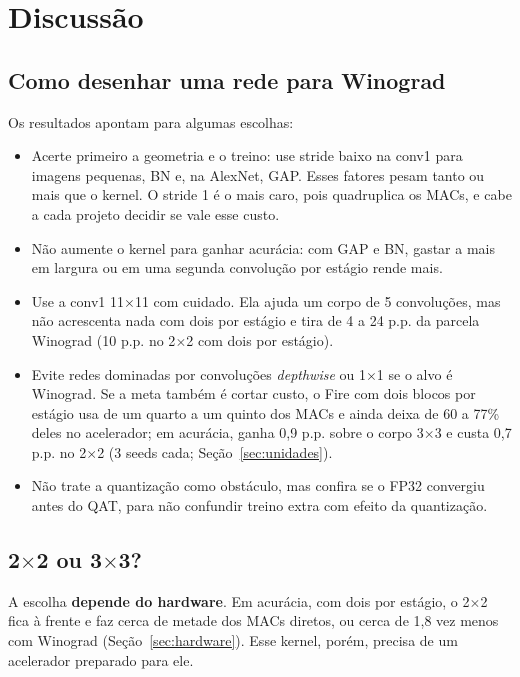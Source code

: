 \documentclass[conference]{IEEEtran}
\newcommand{\by}{\ensuremath{\times}}
\begin{document}
\FloatBarrier

\section{Discussão}

\subsection{Como desenhar uma rede para Winograd}

Os resultados apontam para algumas escolhas:
\begin{itemize}
\item Acerte primeiro a geometria e o treino: use stride baixo na conv1 para imagens pequenas, BN e, na AlexNet, GAP. Esses fatores pesam tanto ou mais que o kernel. O stride 1 é o mais caro, pois quadruplica os MACs, e cabe a cada projeto decidir se vale esse custo.
\item Não aumente o kernel para ganhar acurácia: com GAP e BN, gastar a mais em largura ou em uma segunda convolução por estágio rende mais.
\item Use a conv1 11\by11 com cuidado. Ela ajuda um corpo de 5 convoluções, mas não acrescenta nada com dois por estágio e tira de 4 a 24 p.p. da parcela Winograd (10 p.p. no 2\by2 com dois por estágio).
\item Evite redes dominadas por convoluções \textit{depthwise} ou 1\by1 se o alvo é Winograd. Se a meta também é cortar custo, o Fire com dois blocos por estágio usa de um quarto a um quinto dos MACs e ainda deixa de 60 a 77\% deles no acelerador; em acurácia, ganha 0,9 p.p. sobre o corpo 3\by3 e custa 0,7 p.p. no 2\by2 (3 seeds cada; Seção~\ref{sec:unidades}).
\item Não trate a quantização como obstáculo, mas confira se o FP32 convergiu antes do QAT, para não confundir treino extra com efeito da quantização.
\end{itemize}

\subsection{2\by2 ou 3\by3?}
\label{sec:2x2ou3x3}

A escolha \textbf{depende do hardware}. Em acurácia, com dois por estágio, o 2\by2 fica à frente e faz cerca de metade dos MACs diretos, ou cerca de 1,8 vez menos com Winograd (Seção~\ref{sec:hardware}). Esse kernel, porém, precisa de um acelerador preparado para ele.
\end{document}
